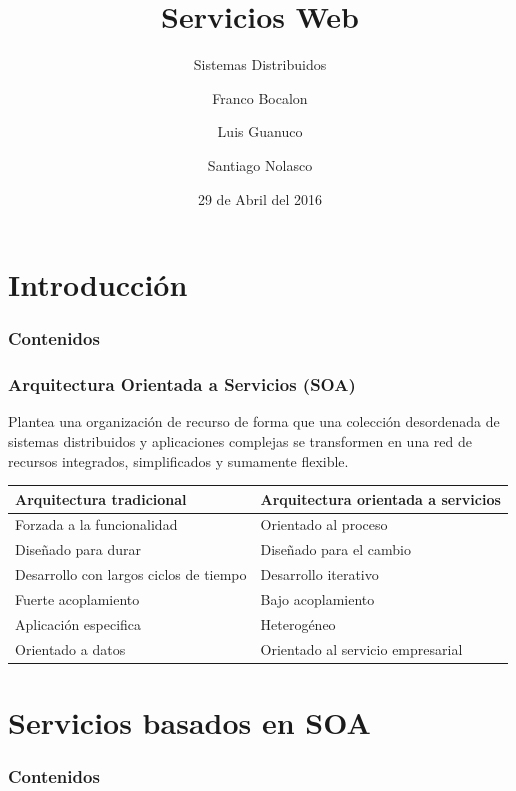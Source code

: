 \documentclass{beamer}
\title{Servicios Web}
\author{Franco Bocalon \and Luis Guanuco \and Santiago Nolasco}
\institute[ESE -- IUA]{Especialización en Sistemabas Embebidos \\
  Instituto Universitario Aeronáutico}
\date{29 de Abril del 2016}
\subtitle{Sistemas Distribuidos}
\begin{document}

\begin{frame}
  \titlepage
\end{frame}

\section{Introducción}

\begin{frame}
  \frametitle{Contenidos}
\end{frame}

\begin{frame}{\insertsection{}}
  \frametitle{Arquitectura Orientada a Servicios (SOA)}
  Plantea una organización de recurso de forma que una colección
  desordenada de sistemas distribuidos y aplicaciones complejas se
  transformen en una red de recursos integrados, simplificados y
  sumamente flexible.
  \vfill
  \centering
  \footnotesize
  \begin{tabular}{|l|l|}
    \hline
    \textbf{Arquitectura tradicional} & \textbf{Arquitectura orientada
      a servicios}\\
    \hline\hline
    Forzada a la funcionalidad & Orientado al proceso \\\hline
    Diseñado para durar & Diseñado para el cambio\\\hline
    Desarrollo con largos ciclos de tiempo & Desarrollo
    iterativo\\\hline
    Fuerte acoplamiento & Bajo acoplamiento \\\hline
    Aplicación especifica & Heterogéneo\\\hline
    Orientado a datos & Orientado al servicio empresarial\\
    \hline
  \end{tabular}
\end{frame}

\section{Servicios basados en SOA}

\begin{frame}
  \frametitle{Contenidos}
\end{frame}
\end{document}
